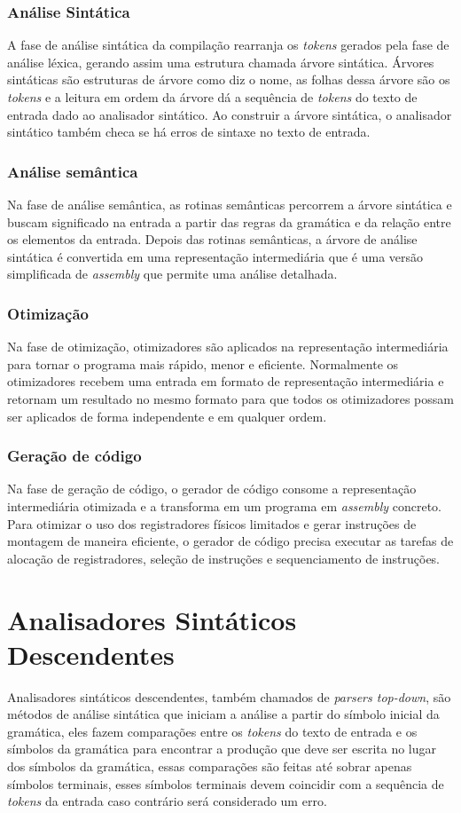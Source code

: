 \subsubsection{Análise Sintática}
A fase de análise sintática da compilação rearranja os \textit{tokens} gerados pela fase de análise léxica, gerando assim uma estrutura chamada árvore sintática. Árvores sintáticas são estruturas de árvore como diz o nome, as folhas dessa árvore são os \textit{tokens} e a leitura em ordem da árvore dá a sequência de \textit{tokens} do texto de entrada dado ao analisador sintático. Ao construir a árvore sintática, o analisador sintático também checa se há erros de sintaxe no texto de entrada.

\subsubsection{Análise semântica}
Na fase de análise semântica, as rotinas semânticas percorrem a árvore sintática e buscam significado na entrada a partir das regras da gramática e da relação entre os elementos da entrada. Depois das rotinas semânticas, a árvore de análise sintática é convertida em uma representação intermediária que é uma versão simplificada de \textit{assembly} que permite uma análise detalhada.

\subsubsection{Otimização}
Na fase de otimização, otimizadores são aplicados na representação intermediária para tornar o programa mais rápido, menor e eficiente. Normalmente os otimizadores recebem uma entrada em formato de representação intermediária e retornam um resultado no mesmo formato para que todos os otimizadores possam ser aplicados de forma independente e em qualquer ordem.

\subsubsection{Geração de código}
Na fase de geração de código, o gerador de código consome a representação intermediária otimizada e a transforma em um programa em \textit{assembly} concreto. Para otimizar o uso dos registradores físicos limitados e gerar instruções de montagem de maneira eficiente, o gerador de código precisa executar as tarefas de alocação de registradores, seleção de instruções e sequenciamento de instruções.

\section{Analisadores Sintáticos Descendentes}
Analisadores sintáticos descendentes, também chamados de \textit{parsers top-down}, são métodos de análise sintática que iniciam a análise a partir do símbolo inicial da gramática, eles fazem comparações entre os \textit{tokens} do texto de entrada e os símbolos da gramática para encontrar a produção que deve ser escrita no lugar dos símbolos da gramática, essas comparações são feitas até sobrar apenas símbolos terminais, esses símbolos terminais devem coincidir com a sequência de \textit{tokens} da entrada caso contrário será considerado um erro.

